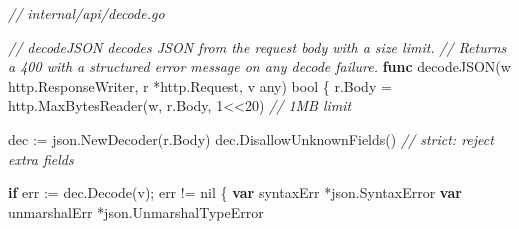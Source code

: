 \documentclass[
]{article}
\newenvironment{Shaded}{}{}
\newcommand{\CommentTok}[1]{\textcolor[rgb]{0.38,0.63,0.69}{\textit{#1}}}
\newcommand{\ControlFlowTok}[1]{\textcolor[rgb]{0.00,0.44,0.13}{\textbf{#1}}}
\newcommand{\DataTypeTok}[1]{\textcolor[rgb]{0.56,0.13,0.00}{#1}}
\newcommand{\DecValTok}[1]{\textcolor[rgb]{0.25,0.63,0.44}{#1}}
\newcommand{\KeywordTok}[1]{\textcolor[rgb]{0.00,0.44,0.13}{\textbf{#1}}}
\newcommand{\NormalTok}[1]{#1}
\newcommand{\OperatorTok}[1]{\textcolor[rgb]{0.40,0.40,0.40}{#1}}
\newcommand{\OtherTok}[1]{\textcolor[rgb]{0.00,0.44,0.13}{#1}}
\begin{document}
\begin{Shaded}
\begin{Highlighting}[]
\CommentTok{// internal/api/decode.go}

\CommentTok{// decodeJSON decodes JSON from the request body with a size limit.}
\CommentTok{// Returns a 400 with a structured error message on any decode failure.}
\KeywordTok{func}\NormalTok{ decodeJSON}\OperatorTok{(}\NormalTok{w http}\OperatorTok{.}\NormalTok{ResponseWriter}\OperatorTok{,}\NormalTok{ r }\OperatorTok{*}\NormalTok{http}\OperatorTok{.}\NormalTok{Request}\OperatorTok{,}\NormalTok{ v any}\OperatorTok{)} \DataTypeTok{bool} \OperatorTok{\{}
\NormalTok{    r}\OperatorTok{.}\NormalTok{Body }\OperatorTok{=}\NormalTok{ http}\OperatorTok{.}\NormalTok{MaxBytesReader}\OperatorTok{(}\NormalTok{w}\OperatorTok{,}\NormalTok{ r}\OperatorTok{.}\NormalTok{Body}\OperatorTok{,} \DecValTok{1}\OperatorTok{\textless{}\textless{}}\DecValTok{20}\OperatorTok{)} \CommentTok{// 1MB limit}

\NormalTok{    dec }\OperatorTok{:=}\NormalTok{ json}\OperatorTok{.}\NormalTok{NewDecoder}\OperatorTok{(}\NormalTok{r}\OperatorTok{.}\NormalTok{Body}\OperatorTok{)}
\NormalTok{    dec}\OperatorTok{.}\NormalTok{DisallowUnknownFields}\OperatorTok{()} \CommentTok{// strict: reject extra fields}

    \ControlFlowTok{if}\NormalTok{ err }\OperatorTok{:=}\NormalTok{ dec}\OperatorTok{.}\NormalTok{Decode}\OperatorTok{(}\NormalTok{v}\OperatorTok{);}\NormalTok{ err }\OperatorTok{!=} \OtherTok{nil} \OperatorTok{\{}
        \KeywordTok{var}\NormalTok{ syntaxErr }\OperatorTok{*}\NormalTok{json}\OperatorTok{.}\NormalTok{SyntaxError}
        \KeywordTok{var}\NormalTok{ unmarshalErr }\OperatorTok{*}\NormalTok{json}\OperatorTok{.}\NormalTok{UnmarshalTypeError}


\end{Highlighting}
\end{Shaded}
\end{document}
